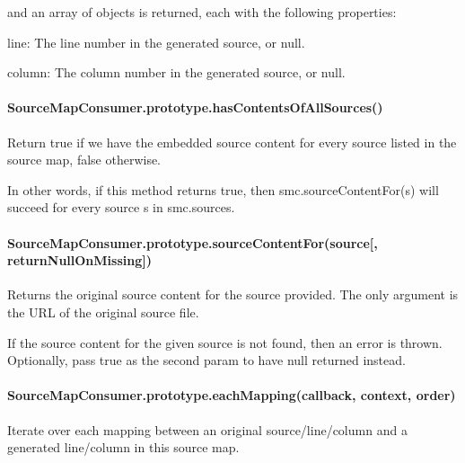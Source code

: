 and an array of objects is returned, each with the following properties\+:


\begin{DoxyItemize}
\item {\ttfamily line}\+: The line number in the generated source, or null.
\item {\ttfamily column}\+: The column number in the generated source, or null.
\end{DoxyItemize}

\paragraph*{Source\+Map\+Consumer.\+prototype.\+has\+Contents\+Of\+All\+Sources()}

Return true if we have the embedded source content for every source listed in the source map, false otherwise.

In other words, if this method returns {\ttfamily true}, then {\ttfamily smc.\+source\+Content\+For(s)} will succeed for every source {\ttfamily s} in {\ttfamily smc.\+sources}.

\paragraph*{Source\+Map\+Consumer.\+prototype.\+source\+Content\+For(source\mbox{[}, return\+Null\+On\+Missing\mbox{]})}

Returns the original source content for the source provided. The only argument is the U\+R\+L of the original source file.

If the source content for the given source is not found, then an error is thrown. Optionally, pass {\ttfamily true} as the second param to have {\ttfamily null} returned instead.

\paragraph*{Source\+Map\+Consumer.\+prototype.\+each\+Mapping(callback, context, order)}

Iterate over each mapping between an original source/line/column and a generated line/column in this source map.


